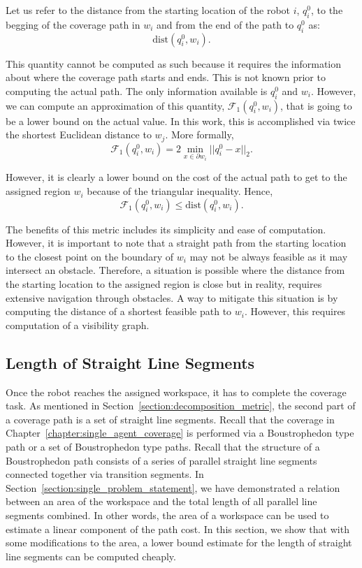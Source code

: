 \documentclass[../main.tex]{subfiles}
\begin{document}
Let us refer to the distance from the starting location of the robot $i$, $q^0_i$, to the begging of the coverage path in $w_i$ and from the end of the path to $q^0_i$ as:
\begin{equation}
	\text{dist}(q^0_i,w_i).
\end{equation}

This quantity cannot be computed as such because it requires the information about where the coverage path starts and ends. This is not known prior to computing the actual path. The only information available is $q^0_i$ and $w_i$. However, we can compute an approximation of this quantity, $\mathcal{F}_1(q^0_i,w_i)$, that is going to be a lower bound on the actual value. In this work, this is accomplished via twice the shortest Euclidean distance to $w_j$. More formally, 
\begin{equation}
	\mathcal{F}_1(q^0_i,w_i)=2\min_{x\in\partial w_i}||q^0_i-x||_2.
\end{equation}

However, it is clearly a lower bound on the cost of the actual path to get to the assigned region $w_i$ because of the triangular inequality. Hence,
\begin{equation}
	\mathcal{F}_1(q^0_i,w_i)\leq\text{dist}(q^0_i,w_i).
\end{equation}

The benefits of this metric includes its simplicity and ease of computation. However, it is important to note that a straight path from the starting location to the closest point on the boundary of $w_i$ may not be always feasible as it may intersect an obstacle. Therefore, a situation is possible where the distance from the starting location to the assigned region is close but in reality, requires extensive navigation through obstacles. A way to mitigate this situation is by computing the distance of a shortest feasible path to $w_i$. However, this requires computation of a visibility graph.


\subsection{Length of Straight Line Segments}
\label{subsection:sum_straight_segments}

Once the robot reaches the assigned workspace, it has to complete the coverage task. As mentioned in Section~\ref{section:decomposition_metric}, the second part of a coverage path is a set of straight line segments. Recall that the coverage in Chapter~\ref{chapter:single_agent_coverage} is performed via a Boustrophedon type path or a set of Boustrophedon type paths. Recall that the structure of a Boustrophedon path consists of a series of parallel straight line segments connected together via transition segments. In Section~\ref{section:single_problem_statement}, we have demonstrated a relation between an area of the workspace and the total length of all parallel line segments combined. In other words, the area of a workspace can be used to estimate a linear component of the path cost. In this section, we show that with some modifications to the area, a lower bound estimate for the length of straight line segments can be computed cheaply.
\end{document}
